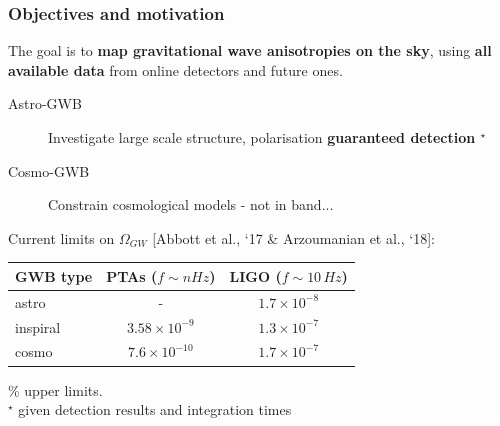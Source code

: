 \documentclass[handout]{beamer}
\begin{document}
\begin{frame}
	\frametitle{Objectives and motivation}
    	
        The goal is to {\bf map gravitational wave anisotropies on the sky}, using {\bf all available data} from online detectors and future ones.\\
        \medskip
        \begin{description}
\item[\textcolor{textcol}{Astro-GWB}] Investigate large scale structure, polarisation  \textcolor{textcol1}{\bf guaranteed detection $^\star$}
\item[\textcolor{textcol}{Cosmo-GWB}]  Constrain cosmological models - not in band...

\end{description}
        

\small
\medskip
Current limits on $\Omega_{GW}$ [Abbott et al., `17 \& Arzoumanian et al., `18]:\\
\medskip
\centering
\begin{tabular}{l | c | c  }
GWB type & PTAs \quad ($f\sim nHz$)& LIGO  \quad ($f\sim 10 \,Hz$) \\
\hline \hline
astro& -& $ 1.7 \times 10^{-8}$\\
inspiral& $3.58\times 10^{-9}$& $1.3 \times 10^{-7}$\\
cosmo& $7.6 \times 10^{-10}$ &  $1.7 \times 10^{-7}$\\
\end{tabular}
\% upper limits.\\
\smallskip
\scriptsize
\textcolor{textcol1}{$^\star$} given detection results and integration times
\end{frame}
\end{document}
